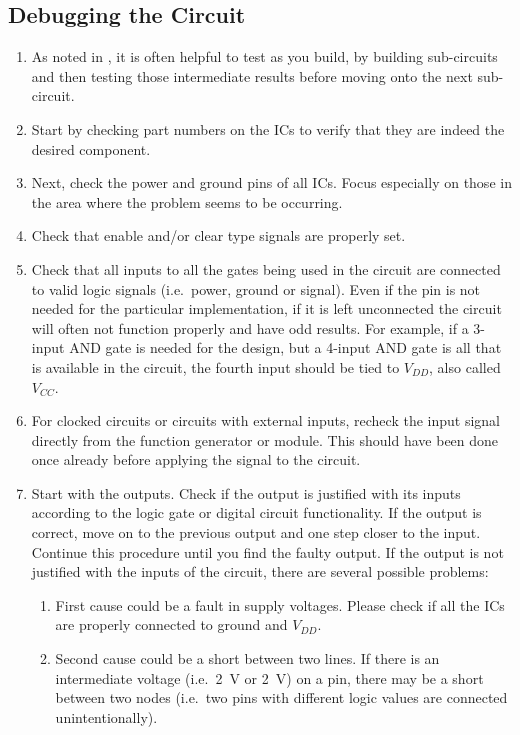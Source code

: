 \documentclass[12pt, logo=tehranDLDL/ut]{tehranDLDL}
\begin{document}
\subsection{Debugging the Circuit}

\begin{enumerate}
    \item As noted in , it is often helpful to test as you build, by building sub-circuits and then testing those intermediate results before moving onto the next sub-circuit.
    \item Start by checking part numbers on the ICs to verify that they are indeed the desired component.
    \item Next, check the power and ground pins of all ICs. Focus especially on those in the area where the problem seems to be occurring.
    \item Check that enable and/or clear type signals are properly set.
    \item Check that all inputs to all the gates being used in the circuit are connected to valid logic signals (i.e.\ power, ground or signal). Even if the pin is not needed for the particular implementation, if it is left unconnected the circuit will often not function properly and have odd results. For example, if a 3-input AND gate is needed for the design, but a 4-input AND gate is all that is available in the circuit, the fourth input should be tied to $V_\mathit{DD}$, also called $V_\mathit{CC}$.
    \item For clocked circuits or circuits with external inputs, recheck the input signal directly from the function generator or module. This should have been done once already before applying the signal to the circuit.
    \item Start with the outputs. Check if the output is justified with its inputs according to the logic gate or digital circuit functionality. If the output is correct, move on to the previous output and one step closer to the input. Continue this procedure until you find the faulty output. If the output is not justified with the inputs of the circuit, there are several possible problems:
    \begin{enumerate}
        \item First cause could be a fault in supply voltages. Please check if all the ICs are properly connected to ground and $V_\mathit{DD}$. 
        \item Second cause could be a short between two lines. If there is an intermediate voltage (i.e.\ \SI{2}{\volt} or \SI{2}{\volt}) on a pin, there may be a short between two nodes (i.e.\ two pins with different logic values are connected unintentionally).

\end{enumerate}
\end{enumerate}
\end{document}
